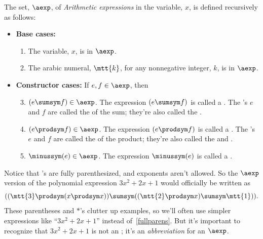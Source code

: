 \begin{definition}\label{A}
The set, $\aexp$, of \emph{Arithmetic expressions} in the variable, $x$,
is defined recursively as follows:

\begin{itemize}
\item \textbf{Base cases:}

\begin{enumerate}

\item The variable, $x$, is in $\aexp$.

\item The arabic numeral, $\mtt{k}$, for any nonnegative integer, $k$, is
  in $\aexp$.

\end{enumerate}

\item \textbf{Constructor cases:} If $e,f \in \aexp$, then
\begin{enumerate}
\setcounter{enumi}{2}

\item $(e \sumsym f) \in \aexp$.  The expression $(e \sumsym f)$ is called a
  .  The \aexp's $e$ and $f$ are called the  of
  the sum; they're also called the .

\item $(e \prodsym f) \in \aexp$.  The expression $(e \prodsym f)$ is called a
  .  The \aexp's $e$ and $f$ are called the
   of the product; they're also called the
   and .

\item $\minussym(e) \in \aexp$.  The expression $\minussym(e)$ is called a
  .
\end{enumerate}
\end{itemize}
\end{definition}

Notice that \aexp's are fully parenthesized, and exponents aren't allowed.
So the $\aexp$ version of the polynomial expression $3x^2 + 2x + 1$ would
officially be written as
\begin{equation}\label{fullparens}
((\mtt{3} \prodsym (x \prodsym x)) \sumsym ((\mtt{2} \prodsym x) \sumsym \mtt{1})).
\end{equation}
These parentheses and $\ast$'s clutter up examples, so we'll often use
simpler expressions like ``$3x^2 + 2x + 1$'' instead
of~\eqref{fullparens}.  But it's important to recognize that $3x^2 + 2x +
1$ is not an \aexp; it's an \emph{abbreviation} for an $\aexp$.

